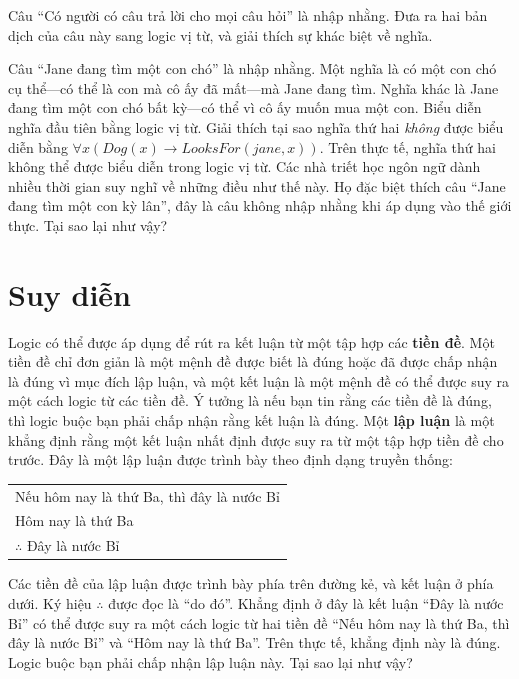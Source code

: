 \begin{exercise}
Câu ``Có người có câu trả lời cho mọi câu hỏi'' là nhập nhằng. Đưa ra hai bản dịch của câu này sang logic vị từ, và giải thích sự khác biệt về nghĩa.
\end{exercise}

\begin{exercise}
Câu ``Jane đang tìm một con chó'' là nhập nhằng. Một nghĩa là có một con chó cụ thể---có thể là con mà cô ấy đã mất---mà Jane đang tìm. Nghĩa khác là Jane đang tìm một con chó bất kỳ---có thể vì cô ấy muốn mua một con. Biểu diễn nghĩa đầu tiên bằng logic vị từ. Giải thích tại sao nghĩa thứ hai \textit{không} được biểu diễn bằng $\forall x(Dog(x) \to LooksFor(jane, x))$. Trên thực tế, nghĩa thứ hai không thể được biểu diễn trong logic vị từ. Các nhà triết học ngôn ngữ dành nhiều thời gian suy nghĩ về những điều như thế này. Họ đặc biệt thích câu ``Jane đang tìm một con kỳ lân'', đây là câu không nhập nhằng khi áp dụng vào thế giới thực. Tại sao lại như vậy?
\end{exercise}


\section{Suy diễn}

Logic có thể được áp dụng để rút ra kết luận từ một tập hợp các \textbf{tiền đề}. Một tiền đề chỉ đơn giản là một mệnh đề được biết là đúng hoặc đã được chấp nhận là đúng vì mục đích lập luận, và một kết luận là một mệnh đề có thể được suy ra một cách logic từ các tiền đề. Ý tưởng là nếu bạn tin rằng các tiền đề là đúng, thì logic buộc bạn phải chấp nhận rằng kết luận là đúng. Một \textbf{lập luận} là một khẳng định rằng một kết luận nhất định được suy ra từ một tập hợp tiền đề cho trước. Đây là một lập luận được trình bày theo định dạng truyền thống:
\begin{center}
\begin{tabular}{l}
Nếu hôm nay là thứ Ba, thì đây là nước Bỉ \\
Hôm nay là thứ Ba \\
\hline
$\therefore$ Đây là nước Bỉ
\end{tabular}
\end{center}
Các tiền đề của lập luận được trình bày phía trên đường kẻ, và kết luận ở phía dưới. Ký hiệu $\therefore$ được đọc là ``do đó''. Khẳng định ở đây là kết luận ``Đây là nước Bỉ'' có thể được suy ra một cách logic từ hai tiền đề ``Nếu hôm nay là thứ Ba, thì đây là nước Bỉ'' và ``Hôm nay là thứ Ba''. Trên thực tế, khẳng định này là đúng. Logic buộc bạn phải chấp nhận lập luận này. Tại sao lại như vậy?

